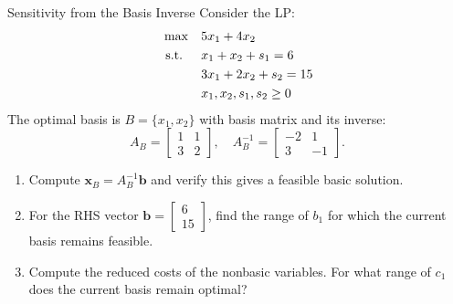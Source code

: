 \begin{ex}{Sensitivity from the Basis Inverse}{}
\label{ex:sensitivity-basis-inverse}
 Consider the LP:
\[
\begin{aligned}
\max \quad & 5x_1 + 4x_2 \\
\text{ s.t. } \quad
& x_1 + x_2 + s_1 = 6 \\
& 3x_1 + 2x_2 + s_2 = 15 \\
& x_1, x_2, s_1, s_2 \geq 0
\end{aligned}
\]
The optimal basis is $B = \{x_1, x_2\}$ with basis matrix and its inverse:
\[
A_B = \begin{bmatrix} 1 & 1 \\ 3 & 2 \end{bmatrix}, \quad
A_B^{-1} = \begin{bmatrix} -2 & 1 \\ 3 & -1 \end{bmatrix}.
\]
\begin{enumerate}
\item Compute $\mathbf{x}_B = A_B^{-1}\mathbf{b}$ and verify this gives a feasible basic solution.
\item For the RHS vector $\mathbf{b} = \begin{bmatrix} 6 \\ 15 \end{bmatrix}$, find the range of $b_1$ for which the current basis remains feasible.
\item Compute the reduced costs of the nonbasic variables. For what range of $c_1$ does the current basis remain optimal?
\end{enumerate}
\exrefs{\S\ref{sec:sensitivity-matrix}}
\end{ex}

